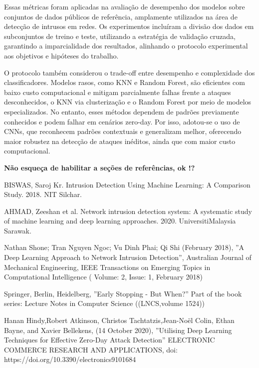 \documentclass[conference]{IEEEtran}
\begin{document}
{    Essas métricas foram aplicadas na avaliação de desempenho dos modelos sobre conjuntos de dados públicos de referência, amplamente utilizados na área de detecção de intrusos em redes. Os experimentos incluíram a divisão dos dados em subconjuntos de treino e teste, utilizando a estratégia de validação cruzada, garantindo a imparcialidade dos resultados, alinhando o protocolo experimental aos objetivos e hipóteses do trabalho.
    
    O protocolo também considerou o trade-off entre desempenho e complexidade dos classificadores. Modelos rasos, como KNN e Random Forest, são eficientes com baixo custo computacional e mitigam parcialmente falhas frente a ataques desconhecidos, o KNN via clusterização e o Random Forest por meio de modelos especializados. No entanto, esses métodos dependem de padrões previamente conhecidos e podem falhar em cenários zero-day. Por isso, adotou-se o uso de CNNs, que reconhecem padrões contextuais e generalizam melhor, oferecendo maior robustez na detecção de ataques inéditos, ainda que com maior custo computacional.





\textbf{Não esqueça de habilitar a seções de referências, ok !?}

\begin{thebibliography}{00}


    BISWAS, Saroj Kr. Intrusion Detection Using Machine Learning: A Comparison Study. 2018. NIT Silchar.
    
    AHMAD, Zeeshan et al. Network intrusion detection system: A systematic study of machine learning and deep learning approaches. 2020. UniversitiMalaysia Sarawak.
    
     Nathan Shone; Tran Nguyen Ngoc; Vu Dinh Phai; Qi Shi  (February 2018), ''A Deep Learning Approach to Network Intrusion Detection'', Australian Journal of Mechanical Engineering, IEEE Transactions on Emerging Topics in Computational Intelligence ( Volume: 2, Issue: 1, February 2018)
    
     Springer, Berlin, Heidelberg, ''Early Stopping - But When?'' Part of the book series: Lecture Notes in Computer Science ((LNCS,volume 1524))
    
     Hanan Hindy,Robert Atkinson, Christos Tachtatzis,Jean-Noël Colin, Ethan Bayne, and Xavier Bellekens, (14 October 2020), ''Utilising Deep Learning Techniques for Effective Zero-Day Attack Detection'' ELECTRONIC COMMERCE RESEARCH AND APPLICATIONS, doi: https://doi.org/10.3390/electronics9101684
    

\end{thebibliography}}
\end{document}
